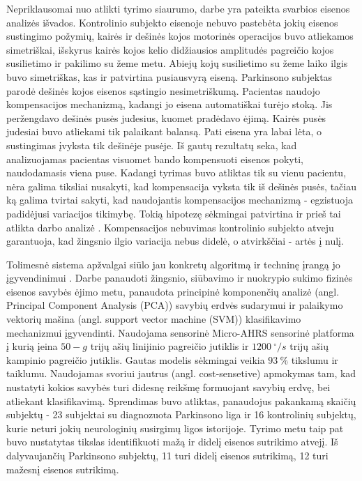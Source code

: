 \documentclass[]{vgtuef}
\begin{document}
Nepriklausomai nuo atlikti tyrimo siaurumo, darbe yra pateikta svarbios eisenos analizės išvados. Kontrolinio subjekto eisenoje nebuvo pastebėta jokių eisenos sustingimo požymių, kairės ir dešinės kojos motorinės operacijos buvo atliekamos simetriškai, išskyrus kairės kojos kelio didžiausios amplitudės pagreičio kojos susilietimo ir pakilimo su žeme metu. Abiejų kojų susilietimo su žeme laiko ilgis buvo simetriškas, kas ir patvirtina pusiausvyrą eiseną. Parkinsono subjektas parodė dešinės kojos eisenos sąstingio nesimetriškumą. Pacientas naudojo kompensacijos mechanizmą, kadangi jo eisena automatiškai turėjo stoką. Jis peržengdavo dešinės pusės judesius, kuomet pradėdavo ėjimą. Kairės pusės judesiai buvo atliekami tik palaikant balansą. Pati eisena yra labai lėta, o sustingimas įvyksta tik dešinėje pusėje. Iš gautų rezultatų seka, kad analizuojamas pacientas visuomet bando kompensuoti eisenos pokyti, naudodamasis viena puse. Kadangi tyrimas buvo atliktas tik su vienu pacientu, nėra galima tiksliai nusakyti, kad kompensacija vyksta tik iš dešinės pusės, tačiau ką galima tvirtai sakyti, kad naudojantis kompensacijos mechanizmą - egzistuoja padidėjusi variacijos tikimybę. Tokią hipotezę sėkmingai patvirtina ir prieš tai atlikta darbo analizė \cite{5280353}. Kompensacijos nebuvimas kontrolinio subjekto atveju garantuoja, kad žingsnio ilgio variacija nebus didelė, o atvirkščiai - artės į nulį.

Tolimesnė sistema apžvalgai siūlo jau konkretų algoritmą ir techninę įrangą jo įgyvendinimui \cite{5627904}. Darbe panaudoti žingsnio, siūbavimo ir nuokrypio sukimo fizinės eisenos savybės ėjimo metu, panaudota principinė komponenčių analizė (angl. Principal Component Analysis (PCA)) savybių erdvės sudarymui ir palaikymo vektorių mašina (angl. support vector machine (SVM)) klasifikavimo mechanizmui įgyvendinti. Naudojama sensorinė Micro-AHRS sensorinė platforma į kurią įeina $50-g$ trijų ašių linijinio pagreičio jutiklis ir $1200~^\circ/s$ trijų ašių kampinio pagreičio jutiklis. Gautas modelis sėkmingai veikia $93~\%$ tikslumu ir taiklumu. Naudojamas svoriui jautrus (angl. cost-sensetive) apmokymas tam, kad nustatyti kokios savybės turi didesnę reikšmę formuojant savybių erdvę, bei atliekant klasifikavimą. Sprendimas buvo atliktas, panaudojus pakankamą skaičių subjektų - 23 subjektai su diagnozuota Parkinsono liga ir 16 kontrolinių subjektų, kurie neturi jokių neurologinių susirgimų ligos istorijoje. Tyrimo metu taip pat buvo nustatytas tikslas identifikuoti mažą ir didelį eisenos sutrikimo atvejį. Iš dalyvaujančių Parkinsono subjektų, 11 turi didelį eisenos sutrikimą, 12 turi mažesnį eisenos sutrikimą. 
\end{document}
